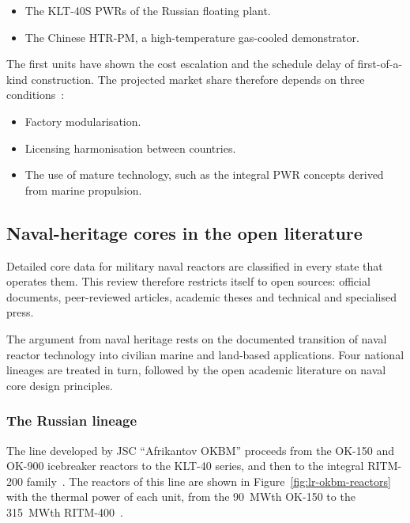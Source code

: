 \begin{itemize}
  \item The KLT-40S PWRs of the Russian floating plant.

  \item The Chinese HTR-PM, a high-temperature gas-cooled demonstrator.
\end{itemize}

The first units have shown the cost escalation and the schedule delay of
first-of-a-kind construction. The projected market share therefore
depends on three conditions~\cite{ritm200n_nei_2024}:

\begin{itemize}
  \item Factory modularisation.

  \item Licensing harmonisation between countries.

  \item The use of mature technology, such as the integral PWR concepts
        derived from marine propulsion.
\end{itemize}

\subsection{Naval-heritage cores in the open literature}
\label{subsec:naval-heritage}

Detailed core data for military naval reactors are classified in every
state that operates them. This review therefore restricts itself to
open sources: official documents, peer-reviewed articles, academic
theses and technical and specialised press.

The argument from naval heritage rests on the documented transition of
naval reactor technology into civilian marine and land-based
applications. Four national lineages are treated in turn, followed by
the open academic literature on naval core design principles.

\subsubsection{The Russian lineage}
\label{subsec:lineage-russia}
The line developed by JSC ``Afrikantov OKBM'' proceeds from the OK-150
and OK-900 icebreaker reactors to the KLT-40 series, and then to the
integral RITM-200 family~\cite{worldnuclearreport_smr}. The reactors of
this line are shown in Figure~\ref{fig:lr-okbm-reactors} with the
thermal power of each unit, from the 90~MWth OK-150 to the 315~MWth
RITM-400~\cite{rosatom_presentation}.

